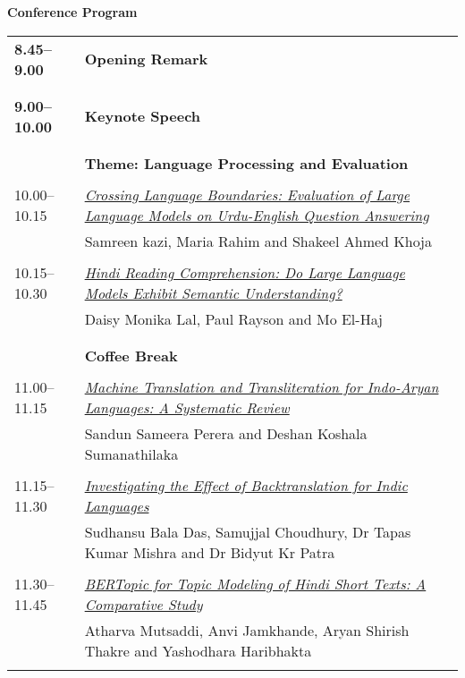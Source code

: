 \setlength{\parindent}{0in}
\setlength{\parskip}{2ex}
\renewcommand{\baselinestretch}{0.87}

\begin{center}
{\Large \bf
  Conference Program
}
\end{center}
\vspace{3mm}
\begin{tabular}{p{20mm}p{128mm}}
\\{\bf 8.45--9.00} & {\bf Opening Remark} \\
\\
\\{\bf 9.00--10.00} & {\bf Keynote Speech} \\
\\
\\ & {\bf Theme: Language Processing and Evaluation} \\
\\
10.00--10.15 & \hyperlink{page.1}{\em Crossing Language Boundaries: Evaluation of Large Language Models on Urdu-English Question Answering}\\
         & Samreen kazi, Maria Rahim and Shakeel Ahmed Khoja \\
\\

10.15--10.30 & \hyperlink{page.12}{\em Hindi Reading Comprehension: Do Large Language Models Exhibit Semantic Understanding?}\\
         & Daisy Monika Lal, Paul Rayson and Mo El-Haj \\
\\

\\ & {\bf Coffee Break} \\
\\
11.00--11.15 & \hyperlink{page.23}{\em Machine Translation and Transliteration for Indo-Aryan Languages: A Systematic Review}\\
         & Sandun Sameera Perera and Deshan Koshala Sumanathilaka \\
\\

11.15--11.30 & \hyperlink{page.34}{\em Investigating the Effect of Backtranslation for Indic Languages}\\
         & Sudhansu Bala Das, Samujjal Choudhury, Dr Tapas Kumar Mishra and Dr Bidyut Kr Patra \\
\\

11.30--11.45 & \hyperlink{page.49}{\em BERTopic for Topic Modeling of Hindi Short Texts: A Comparative Study}\\
         & Atharva Mutsaddi, Anvi Jamkhande, Aryan Shirish Thakre and Yashodhara Haribhakta \\
\\


\end{tabular}
